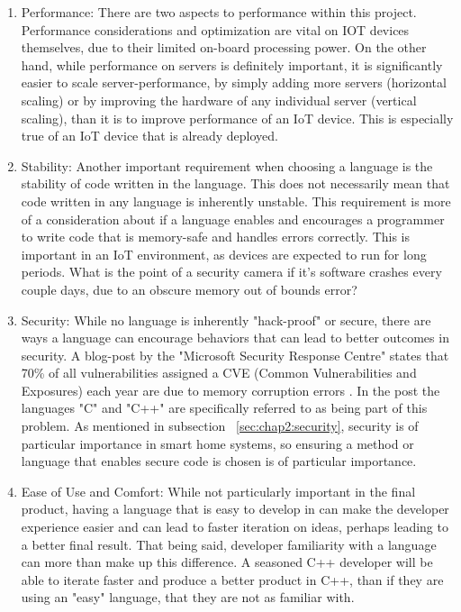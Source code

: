 \begin{enumerate} 
    \item Performance: There are two aspects to performance within this project. Performance considerations and optimization are vital on IOT devices themselves, due to their limited on-board processing power. On the other hand, while performance on servers is definitely important, it is significantly easier to scale server-performance, by simply adding more servers (horizontal scaling) or by improving the hardware of any individual server (vertical scaling), than it is to improve performance of an IoT device. This is especially true of an IoT device that is already deployed.
    \item Stability: Another important requirement when choosing a language is the stability of code written in the language. This does not necessarily mean that code written in any language is inherently unstable. This requirement is more of a consideration about if a language enables and encourages a programmer to write code that is memory-safe and handles errors correctly. This is important in an IoT environment, as devices are expected to run for long periods. What is the point of a security camera if it's software crashes every couple days, due to an obscure memory out of bounds error? 
    \item Security: While no language is inherently "hack-proof" or secure, there are ways a language can encourage behaviors that can lead to better outcomes in security. A blog-post by the "Microsoft Security Response Centre" states that 70\% of all vulnerabilities assigned a CVE (Common Vulnerabilities and Exposures) each year are due to memory corruption errors \cite{ProactiveApproachToSecureCode}. In the post the languages "C" and "C++" are specifically referred to as being part of this problem. As mentioned in subsection ~\ref{sec:chap2:security}, security is of particular importance in smart home systems, so ensuring a method or language that enables secure code is chosen is of particular importance. 
    \item Ease of Use and Comfort: While not particularly important in the final product, having a language that is easy to develop in can make the developer experience easier and can lead to faster iteration on ideas, perhaps leading to a better final result. That being said, developer familiarity with a language can more than make up this difference. A seasoned C++ developer will be able to iterate faster and produce a better product in C++, than if they are using an "easy" language, that they are not as familiar with.
\end{enumerate}
